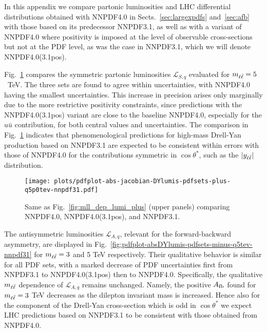 
In this appendix we compare partonic luminosities
and LHC differential distributions obtained with NNPDF4.0 in
Sects.~\ref{sec:largexpdfs}
and~\ref{sec:afb} with those based 
on its predecessor
NNPDF3.1, as well as with a variant of NNPDF4.0
where positivity is imposed at the level of observable cross-sections but
not at the PDF level, as was the case in  NNPDF3.1, which we will denote
NNPDF4.0(3.1pos).

Fig.~\ref{fig:pdfplot-absDYlumis-pdfsets-plus-q5tev-nnpdf31}
compares the 
symmetric partonic luminosities $\mathcal{L}_{S,q}$
evaluated for $m_{\ell\bar{\ell}}=5$~TeV.
%
The three sets are found to agree within uncertainties,
with NNPDF4.0 having the smallest uncertainties.
%
This increase in precision
arises only marginally due to the more restrictive positivity constraints,
since predictions with the NNPDF4.0(3.1pos) variant 
are close to the baseline NNPDF4.0, especially 
for the $u\bar{u}$ contribution, for both central values and uncertainties.
%
The comparison in Fig.~\ref{fig:pdfplot-absDYlumis-pdfsets-plus-q5tev-nnpdf31}
indicates that phenomenological predictions for high-mass Drell-Yan
production based on NNPDF3.1 are expected
to be consistent within errors with those of NNPDF4.0 for the contributions
symmetric in $\cos\theta^*$, such as the $|y_{\ell\bar{\ell}}|$ distribution.

\begin{figure}[!t]
 \centering
 \texttt{[image: plots/pdfplot-abs-jacobian-DYlumis-pdfsets-plus-q5p0tev-nnpdf31.pdf]}
 \caption{Same as Fig.~\ref{fig:mll_dep_lumi_plus} (upper panels) comparing
NNPDF4.0, NNPDF4.0(3.1pos), and NNPDF3.1.
 }    
 \label{fig:pdfplot-absDYlumis-pdfsets-plus-q5tev-nnpdf31}
\end{figure}

The antisymmetric luminosities $\mathcal{L}_{A,q}$, relevant for the
forward-backward asymmetry, are displayed in Fig.~\ref{fig:pdfplot-absDYlumis-pdfsets-minus-q5tev-nnpdf31}
for $m_{\ell\bar{\ell}} = 3$ and 5 TeV respectively.
%
Their qualitative behavior is similar for all  PDF sets,
with a marked decrease of PDF uncertainties first from NNPDF3.1
to  NNPDF4.0(3.1pos)  then
to NNPDF4.0.
%
Specifically, the qualitative $m_{\ell\bar{\ell}}$ dependence
of $\mathcal{L}_{A,q}$ remains unchanged. Namely, the positive $A_{\rm fb}$
found for $m_{\ell\bar{\ell}}= 3$ TeV decreases 
as the dilepton invariant mass is increased.
%
Hence also for the component of the Drell-Yan cross-section which is odd
in $\cos\theta^*$ we expect LHC predictions based on NNPDF3.1 to be consistent
with those obtained from NNPDF4.0.


